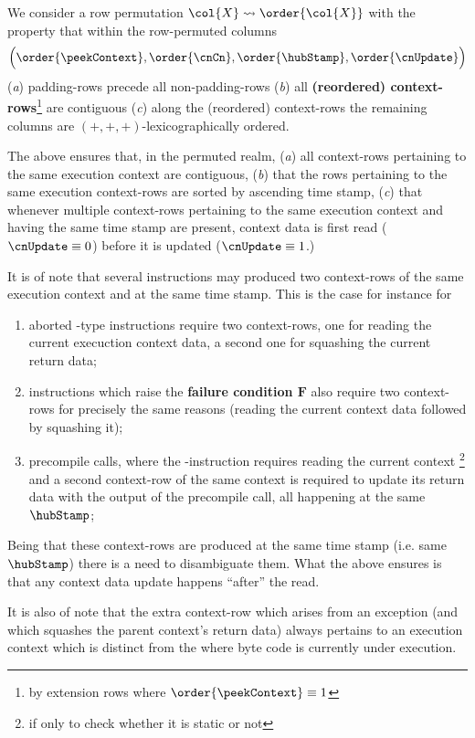 We consider a row permutation $\col{X}\rightsquigarrow\order{\col{X}}$ with the property that within the row-permuted columns
\[
	\Big(
	\order{\peekContext},
	\order{\cnCn},
	\order{\hubStamp},
	\order{\cnUpdate}
	\Big)
\]
(\emph{a}) padding-rows precede all non-padding-rows
(\emph{b}) all \textbf{(reordered) context-rows}\footnote{by extension rows where $\order{\peekContext} \equiv 1$} are contiguous
(\emph{c}) along the (reordered) context-rows the remaining columns are $(+, +, +)$-lexicographically ordered.

\saNote{}
The above ensures that, in the permuted realm,
(\emph{a}) all context-rows pertaining to the same execution context are contiguous,
(\emph{b}) that the rows pertaining to the same execution context-rows are sorted by ascending time stamp,
(\emph{c}) that whenever multiple context-rows pertaining to the same execution context and having the same time stamp are present,
context data is first read ($\cnUpdate \equiv 0$) before it is updated ($\cnUpdate \equiv 1$.)

\saNote{}
It is of note that several instructions may produced two context-rows of the same execution context and at the same time stamp.
This is the case for instance for
\begin{enumerate}
	\item
		aborted -type instructions require two context-rows,
		one for reading the current execuction context data,
		a second one for squashing the current return data;
	\item
		 instructions which raise the \textbf{failure condition $\bm{F}$}
		also require two context-rows for precisely the same reasons
		(reading the current context data followed by squashing it);
        \item
		precompile calls, where the -instruction requires reading the current context%
		\footnote{if only to check whether it is static or not}
		and a second context-row of the same context is required to update its return data with the
		output of the precompile call, all happening at the same $\hubStamp$;
\end{enumerate}
Being that these context-rows are produced at the same time stamp (i.e. same $\hubStamp$) there is a need to disambiguate them.
What the above ensures is that any context data update happens ``after'' the read.

\saNote{}
It is also of note that the extra context-row which arises from an exception (and which squashes the parent context's return data)
always pertains to an execution context which is distinct from the where byte code is currently under execution.
